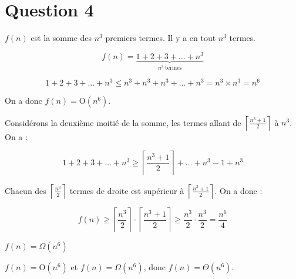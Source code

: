 \newpage
\section*{Question 4}
$f(n)$ est la somme des $n^3$ premiers termes. Il y a en tout $n^3$ termes.

\[f(n) = \underbrace{1 + 2 + 3 + \dots + n^3}_{n^3\ \text{termes}}\]

\[1 + 2 + 3 + \dots + n^3 \leq n^3 + n^3 + n^3 + \dots + n^3 = n^3 \times n^3 = n^6\]

On a donc $f(n) = \mathrm{O} (n^6)$.

Considérons la deuxième moitié de la somme, les termes allant de $\left\lceil \frac{n^3+1}{2} \right\rceil$ à $n^3$. On a :

\[1 + 2 + 3 + \dots + n^3 \geq \left\lceil\frac{n^3+1}{2}\right\rceil + \dots + n^3 -1 + n^3\]

Chacun des $\left\lceil \frac{n^3}{2} \right\rceil$ termes de droite est supérieur à $\left\lceil\frac{n^3+1}{2}\right\rceil$. On a donc :

\[ f(n) \geq \left\lceil\frac{n^3}{2}\right\rceil \cdot \left\lceil\frac{n^3+1}{2}\right\rceil \geq \frac{n^3}{2} \cdot \frac{n^3}{2} = \frac{n^6}{4}\]

$f(n) = \Omega (n^6)$

$f(n) = \mathrm{O} (n^6)$ et $f(n) = \Omega (n^6)$, donc  $f(n) = \Theta (n^6)$.